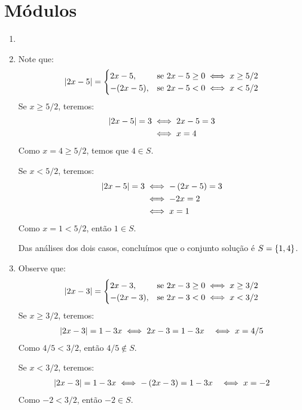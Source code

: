 \section{Módulos}

\begin{solution}
\begin{enumerate}
	\item[]
	\item Note que:
	\begin{align*}
		\left|2x-5\right| = 
		\begin{cases}
		2x-5,    & \text{se } 2x-5 \ge 0 \iff x \ge 5/2 \\
		-(2x-5), & \text{se } 2x-5 < 0 \iff x < 5/2
		\end{cases}
	\end{align*}
	Se $x \ge 5/2$, teremos:
	\begin{align*}
	\left|2x-5\right|=3 &\iff 2x-5=3 \\
				  &\iff x=4
	\end{align*}
	Como $x=4\ge5/2$, temos que $4 \in S$.

	Se $x<5/2$, teremos:
	\begin{align*}
		\left|2x-5\right|=3 &\iff -\left(2x-5\right)=3 \\
					  &\iff -2x=2 \\
					  &\iff x=1 
	\end{align*}
	Como $x=1<5/2$, então $1 \in S$.

	Das análises dos dois casos, concluímos que o conjunto solução é $S=\left\{1,4\right\}$.

	\item Observe que:
	\begin{align*}
		\left|2x-3\right|= 
		\begin{cases}
			2x-3,    & \text{se } 2x-3 \ge 0 \iff x \ge 3/2 \\
			-(2x-3), & \text{se } 2x-3 < 0 \iff x < 3/2
		\end{cases}
	\end{align*}
	Se $x \ge 3/2$, teremos:
	\begin{align*}
		\left|2x-3\right|=1-3x &\iff 2x-3=1-3x
						 &\iff x = 4/5
	\end{align*}
	Como $4/5 < 3/2$, então $4/5 \notin S$.

	Se $x < 3/2$, teremos:
	\begin{align*}
		\left|2x-3\right|=1-3x &\iff -\left(2x-3\right)=1-3x
						 &\iff x = -2
	\end{align*}
	Como $-2 < 3/2$, então $-2 \in S$.


\end{enumerate}
\end{solution}
